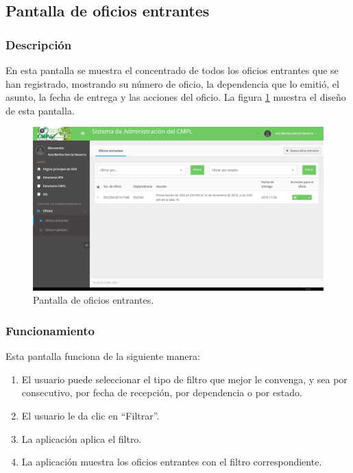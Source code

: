 \subsection{Pantalla de oficios entrantes}
\subsubsection{Descripción}
	En esta pantalla se muestra el concentrado de todos los oficios entrantes que se han registrado, mostrando su número de oficio, la dependencia que lo emitió, el asunto, la fecha de entrega y las acciones del oficio. La figura \ref{fig:OficiosEntrantes} muestra el diseño de esta pantalla.		
		
	\begin{figure}[htbp!]
		\centering
			\includegraphics[width=1\textwidth]{Pantallas/OficiosEntrantes.png}
		\caption{Pantalla de oficios entrantes.}
		\label{fig:OficiosEntrantes}
	\end{figure}

\subsubsection{Funcionamiento}
	Esta pantalla funciona de la siguiente manera:
	
	\begin{enumerate}
		\item El usuario puede seleccionar el tipo de filtro que mejor le convenga, y sea por consecutivo, por fecha de recepción, por dependencia o por estado.
		\item El usuario le da clic en ``Filtrar''.
		\item La aplicación aplica el filtro.
		\item La aplicación muestra los oficios entrantes con el filtro correspondiente.
	\end{enumerate}

